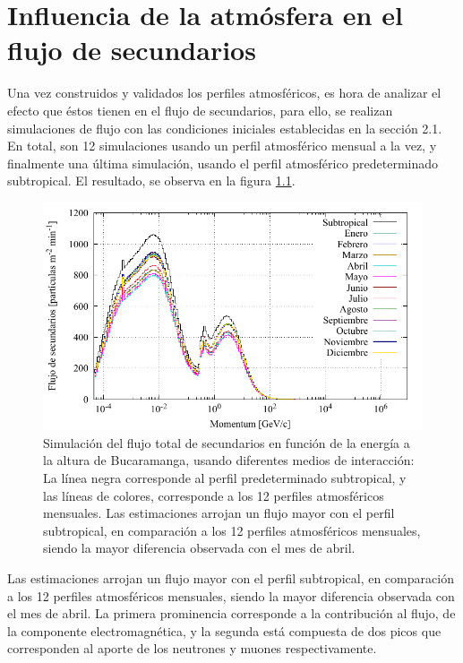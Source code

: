 
\newpage

\chapter{Influencia de la atmósfera en el flujo de secundarios}

\noindent Una vez construidos y validados los perfiles atmosféricos, es hora de analizar el efecto que éstos tienen en el flujo de secundarios, para ello, se realizan simulaciones de flujo con las condiciones iniciales establecidas en la sección 2.1. En total, son 12 simulaciones usando un perfil atmosférico mensual a la vez, y finalmente una última simulación, usando el perfil atmosférico predeterminado subtropical. El resultado, se observa en la figura \ref{fig:fig19}.\\

\begin{figure}[htb!]
\centering
\includegraphics[width=1\textwidth]{Figs/flux_bucaramanga_1212.pdf}
\caption[Flujo de secundarios en función de la energía a la altura de Bucaramanga.]{Simulación del flujo total de secundarios en función de la energía a la altura de Bucaramanga, usando diferentes medios de interacción: La línea negra corresponde al perfil predeterminado subtropical, y las líneas de colores, corresponde a los 12 perfiles atmosféricos mensuales. Las estimaciones arrojan un flujo mayor con el perfil subtropical, en comparación a los 12 perfiles atmosféricos mensuales, siendo la mayor diferencia observada con el mes de abril.}
\label{fig:fig19}
\end{figure}
Las estimaciones arrojan un flujo mayor con el perfil subtropical, en comparación a los 12 perfiles atmosféricos mensuales, siendo la mayor diferencia observada con el mes de abril. La primera prominencia corresponde a la contribución al flujo, de la componente electromagnética, y la segunda está compuesta de dos picos que corresponden al aporte de los neutrones y muones respectivamente.\\ 

